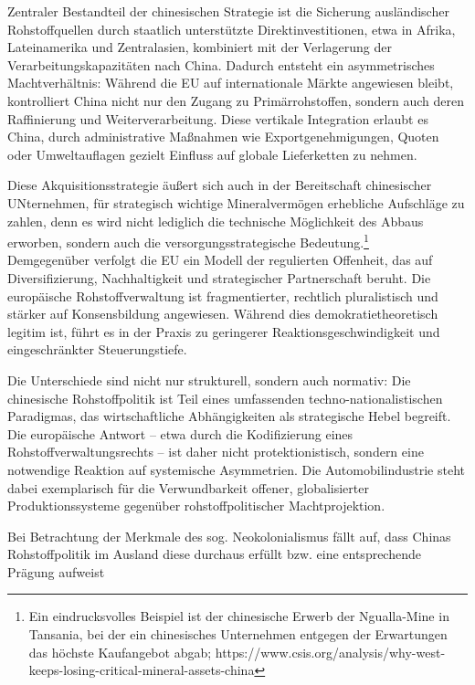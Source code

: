 \documentclass[12pt,a4paper,oneside]{book} %
\begin{document}
{Zentraler Bestandteil der chinesischen Strategie ist die Sicherung ausländischer Rohstoffquellen durch staatlich unterstützte Direktinvestitionen, etwa in Afrika, Lateinamerika und Zentralasien, kombiniert mit der Verlagerung der Verarbeitungskapazitäten nach China. Dadurch entsteht ein asymmetrisches Machtverhältnis: Während die EU auf internationale Märkte angewiesen bleibt, kontrolliert China nicht nur den Zugang zu Primärrohstoffen, sondern auch deren Raffinierung und Weiterverarbeitung. Diese vertikale Integration erlaubt es China, durch administrative Maßnahmen wie Exportgenehmigungen, Quoten oder Umweltauflagen gezielt Einfluss auf globale Lieferketten zu nehmen.

Diese Akquisitionsstrategie äußert sich auch in der Bereitschaft chinesischer UNternehmen, für strategisch wichtige Mineralvermögen erhebliche Aufschläge zu zahlen, denn es wird nicht lediglich die technische Möglichkeit des Abbaus erworben, sondern auch die versorgungsstrategische Bedeutung.\footnote{Ein eindrucksvolles Beispiel ist der chinesische Erwerb der Ngualla-Mine in Tansania, bei der ein chinesisches Unternehmen entgegen der Erwartungen das höchste Kaufangebot abgab; https://www.csis.org/analysis/why-west-keeps-losing-critical-mineral-assets-china }
\\
Demgegenüber verfolgt die EU ein Modell der regulierten Offenheit, das auf Diversifizierung, Nachhaltigkeit und strategischer Partnerschaft beruht. Die europäische Rohstoffverwaltung ist fragmentierter, rechtlich pluralistisch und stärker auf Konsensbildung angewiesen. Während dies demokratietheoretisch legitim ist, führt es in der Praxis zu geringerer Reaktionsgeschwindigkeit und eingeschränkter Steuerungstiefe.

Die Unterschiede sind nicht nur strukturell, sondern auch normativ: Die chinesische Rohstoffpolitik ist Teil eines umfassenden techno-nationalistischen Paradigmas, das wirtschaftliche Abhängigkeiten als strategische Hebel begreift. Die europäische Antwort – etwa durch die Kodifizierung eines Rohstoffverwaltungsrechts – ist daher nicht protektionistisch, sondern eine notwendige Reaktion auf systemische Asymmetrien. Die Automobilindustrie steht dabei exemplarisch für die Verwundbarkeit offener, globalisierter Produktionssysteme gegenüber rohstoffpolitischer Machtprojektion.

Bei Betrachtung der Merkmale des sog. Neokolonialismus fällt auf, dass Chinas Rohstoffpolitik im Ausland diese durchaus erfüllt bzw. eine entsprechende Prägung aufweist

}
\end{document}
